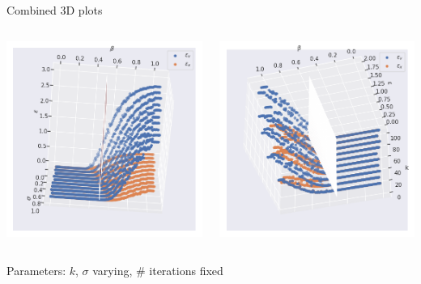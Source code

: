 \documentclass{beamer}
\begin{document}
\begin{frame}{Combined 3D plots}
	\begin{minipage}[0.95\textheight]{\textwidth}
	\begin{columns}[T]
	\begin{column}{0.50\textwidth}
	\includegraphics[width=\textwidth, keepaspectratio]{images/N100_3d.png}
	\end{column}
	\begin{column}{0.50\textwidth}
	\includegraphics[width=\textwidth, keepaspectratio]{images/sigma1_3d.png}
	\end{column}
	\end{columns}
	\end{minipage}
	\begin{center}
		Parameters: $k$, $\sigma$ varying, \# iterations fixed
	\end{center}
\end{frame}
\end{document}
